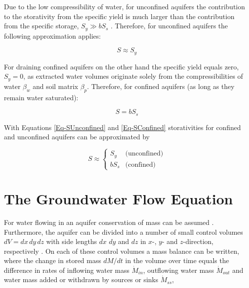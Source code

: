 
Due to the low compressibility of water, for unconfined aquifers the contribution to the storativity from the specific yield is much larger than the contribution from the specific storage, $S_y \gg b S_s$ \parencite{Todd.2005}. 
Therefore, for unconfined aquifers the following approximation applies:

\begin{equation}
    \label{Eq-SUnconfined}
    S \approx S_y
\end{equation}

For draining confined aquifers on the other hand the specific yield equals zero, $S_y = 0$, as extracted water volumes originate solely from the compressibilities of water $\beta_w$ and soil matrix $\beta_p$. 
Therefore, for confined aquifers (as long as they remain water saturated):

\begin{equation}
    \label{Eq-SConfined}
    S = b S_s
\end{equation}

With Equations \eqref{Eq-SUnconfined} and \eqref{Eq-SConfined} storativities for confined and unconfined aquifers can be approximated by

\begin{equation}
    S \approx
    \begin{cases}
        S_y & \textrm{(unconfined)} \\
        b S_s & \textrm{(confined)}
    \end{cases}
\end{equation}


\section{The Groundwater Flow Equation}
\label{Sec-GWFlowEq}

For water flowing in an aquifer conservation of mass can be assumed \parencite{Mays.2005}. 
Furthermore, the aquifer can be divided into a number of small control volumes $dV = dx \, dy \, dz$ with side lengths $dx$ $dy$ and $dz$ in $x$-, $y$- and $z$-direction, respectively \parencite{Fetter.2001}. 
On each of these control volumes a mass balance can be written, where the change in stored mass $dM / dt$ in the volume over time equals the difference in rates of inflowing water mass $\dot{M}_{in}$, outflowing water mass $\dot{M}_{out}$ and water mass added or withdrawn by sources or sinks $\dot{M}_{ss}$,

